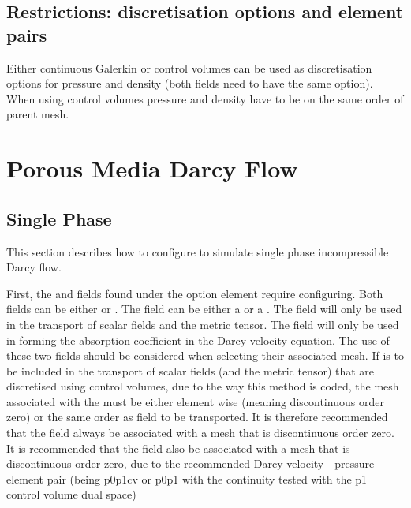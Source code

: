 \subsection{Restrictions: discretisation options and element pairs}
Either continuous Galerkin or control volumes can be used as discretisation options for pressure and density (both fields need to have the same option). When using control volumes pressure and density have to be on the same order of parent mesh.

\section{Porous Media Darcy Flow}
\label{sec:porous_media_darcy_flow_configure}

\subsection{Single Phase}

This section describes how to configure \fluidity to simulate single phase incompressible Darcy flow.

First, the  and  fields found under the option element  require configuring. Both fields can be either  or . The  field can be either a  or a . The  field will only be used in the transport of scalar fields and the metric tensor. The  field will only be used in forming the absorption coefficient in the Darcy velocity equation. The use of these two fields should be considered when selecting their associated mesh. If  is to be included in the transport of scalar fields (and the metric tensor) that are discretised using control volumes, due to the way this method is coded, the mesh associated with the  must be either element wise (meaning discontinuous order zero) or the same order as field to be transported. It is therefore recommended that the  field always be 
associated with a mesh that is discontinuous order zero. It is recommended that the  field also be associated with a mesh that is discontinuous order zero, due to the recommended Darcy velocity - pressure element pair (being p0p1cv or p0p1 with the continuity tested with the p1 control volume dual space)

